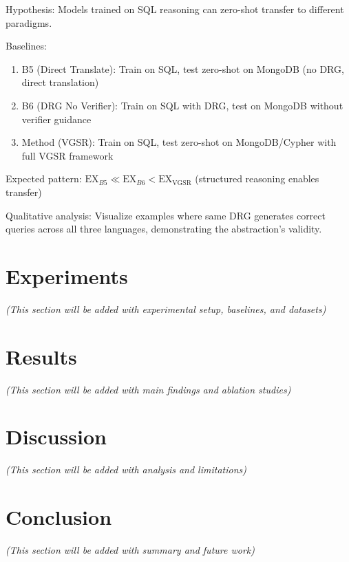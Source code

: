\documentclass[conference]{IEEEtran}
\begin{document}
Hypothesis: Models trained on SQL reasoning can zero-shot transfer to different paradigms.

Baselines:
\begin{enumerate}
\item B5 (Direct Translate): Train on SQL, test zero-shot on MongoDB (no DRG, direct translation)
\item B6 (DRG No Verifier): Train on SQL with DRG, test on MongoDB without verifier guidance
\item Method (VGSR): Train on SQL, test zero-shot on MongoDB/Cypher with full VGSR framework
\end{enumerate}

Expected pattern: $\text{EX}_{B5} \ll \text{EX}_{B6} < \text{EX}_{\text{VGSR}}$ (structured reasoning enables transfer)

Qualitative analysis: Visualize examples where same DRG generates correct queries across all three languages, demonstrating the abstraction's validity.

\section{Experiments}
\label{sec:experiments}

\textit{(This section will be added with experimental setup, baselines, and datasets)}

\section{Results}
\label{sec:results}

\textit{(This section will be added with main findings and ablation studies)}

\section{Discussion}
\label{sec:discussion}

\textit{(This section will be added with analysis and limitations)}

\section{Conclusion}
\label{sec:conclusion}

\textit{(This section will be added with summary and future work)}
\end{document}

